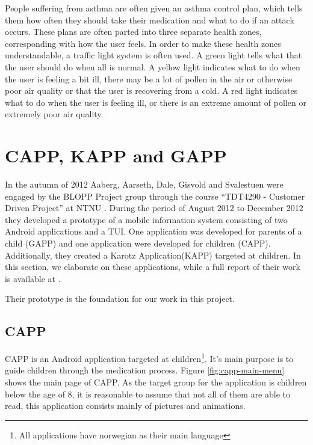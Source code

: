 People suffering from asthma are often given an asthma control plan, which tells them how often they should take their medication and what to do if an attack occurs. These plans are often parted into three separate health zones, corresponding with how the user feels. In order to make these health zones understandable, a traffic light system is often used. A green light tells what that the user should do when all is normal. A yellow light indicates what to do when the user is feeling a bit ill, there may be a lot of pollen in the air or otherwise poor air quality or that the user is recovering from a cold. A red light indicates what to do when the user is feeling ill, or there is an extreme amount of pollen or extremely poor air quality.  


\section{CAPP, KAPP and GAPP}
\label{sec:cappgappkapp}
In the autumn of 2012 Aaberg, Aarseth, Dale, Gisvold and Svalestuen were engaged by the BLOPP Project group through the course ``TDT4290 - Customer Driven Project'' at NTNU . During the period of August 2012 to December 2012 they developed a prototype of a mobile information system consisting of two Android applications and a TUI. One application was developed for parents of a child (GAPP) and one application were developed for children (CAPP). Additionally, they created a Karotz Application(KAPP) targeted at children. In this section, we elaborate on these applications, while a full report of their work is available at \cite{CustomerDriven}. %

Their prototype is the foundation for our work in this project. %

\subsection{CAPP}
\label{sec:description-capp}
CAPP is an Android application targeted at children\footnote{All applications have norwegian as their main language}. It's main purpose is to guide children through the medication process. Figure \ref{fig:capp-main-menu} shows the main page of CAPP.  
As the target group for the application is children below the age of 8, it is reasonable to assume that not all of them are able to read, this application consists mainly of pictures and animations.



